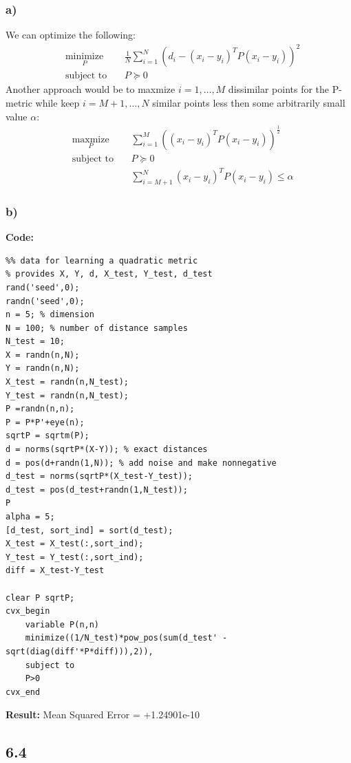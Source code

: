 \documentclass[12pt]{article}
\begin{document}
\subsubsection*{a)}
We can optimize the following:
\begin{equation*}
\begin{aligned}
& \underset{P}{\text{minimize}}
& & \frac{1}{N}\sum_{i=1}^{N}(d_i - (x_i-y_i)^TP(x_i-y_i))^2\\
& \text{subject to}\
& & P \succeq 0
\end{aligned}
\end{equation*}
Another approach would be to maxmize $i=1,\dots,M$ dissimilar points for the P-metric while keep $i=M+1,\dots,N$ similar points less then some arbitrarily small value $\alpha$:
\begin{equation*}
\begin{aligned}
& \underset{P}{\text{maxmize}}
& & \sum_{i=1}^{M}((x_i-y_i)^TP(x_i-y_i))^\frac{1}{2}\\
& \text{subject to}\
& & P \succeq 0\\
& & & \sum_{i=M+1}^{N}(x_i-y_i)^TP(x_i-y_i) \le \alpha
\end{aligned}
\end{equation*}
\subsubsection*{b)}
\textbf{Code:}
\begin{lstlisting}
%% data for learning a quadratic metric
% provides X, Y, d, X_test, Y_test, d_test
rand('seed',0);
randn('seed',0);
n = 5; % dimension
N = 100; % number of distance samples
N_test = 10;
X = randn(n,N);
Y = randn(n,N);
X_test = randn(n,N_test);
Y_test = randn(n,N_test);
P =randn(n,n);
P = P*P'+eye(n);
sqrtP = sqrtm(P);
d = norms(sqrtP*(X-Y)); % exact distances
d = pos(d+randn(1,N)); % add noise and make nonnegative
d_test = norms(sqrtP*(X_test-Y_test));
d_test = pos(d_test+randn(1,N_test));
P
alpha = 5;
[d_test, sort_ind] = sort(d_test);
X_test = X_test(:,sort_ind);
Y_test = Y_test(:,sort_ind);
diff = X_test-Y_test

clear P sqrtP;
cvx_begin
    variable P(n,n)
    minimize((1/N_test)*pow_pos(sum(d_test' - sqrt(diag(diff'*P*diff))),2)),
    subject to
    P>0
cvx_end

\end{lstlisting}
\textbf{Result:}
Mean Squared Error = +1.24901e-10

\subsection*{6.4}
\end{document}

